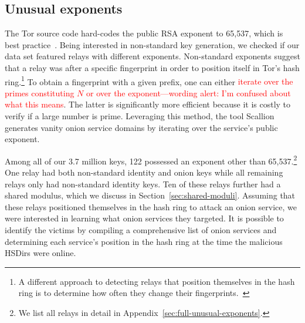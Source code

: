 \subsection{Unusual exponents}
\label{sec:unusual-exponents}
The Tor source code hard-codes the public RSA exponent to 65,537, which is best
practice~\cite[\S~4]{Boneh1999a}.  Being interested in non-standard key
generation, we checked if our data set featured relays with different
exponents.  Non-standard exponents suggest that a relay was after a specific
fingerprint in order to position itself in Tor's hash ring.\footnote{A different
approach to detecting relays that position themselves in the hash ring is to
determine how often they change their fingerprints.~\cite[\S~4.3.3]{Winter2016a}}
To obtain a fingerprint with a given prefix, one can either \textcolor{red}{iterate over the
primes constituting $N$ or over the exponent---wording alert: I'm confused about what this means}.  
The latter is significantly more
efficient because it is costly to verify if a large number is prime.  Leveraging
this method, the tool Scallion~\cite{scallion} generates vanity onion service
domains by iterating over the service's public exponent.

Among all of our 3.7 million keys, 122 possessed an exponent other than
65,537.\footnote{We list all relays in detail in
Appendix~\ref{sec:full-unusual-exponents}.} One relay had both 
non-standard identity and onion keys while all remaining relays only had
non-standard identity keys.  Ten of these relays further had a shared modulus,
which we discuss in Section~\ref{sec:shared-moduli}.  Assuming that these relays
positioned themselves in the hash ring to attack an onion service, we were
interested in learning what onion services they targeted.  It is possible to
identify the victims by compiling a comprehensive list of onion services and
determining each service's position in the hash ring at the time the malicious
HSDirs were online.  


